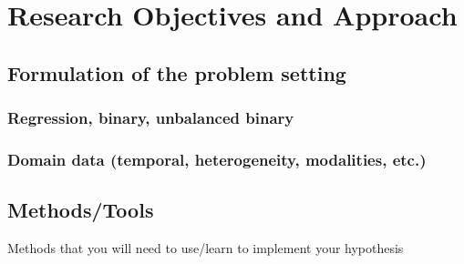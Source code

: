 \chapter{Research Objectives and Approach}
\label{cha:objectives}




\section{Formulation of the problem setting} %
\label{sec:problem}


\subsection{Regression, binary, unbalanced binary}

\subsection{Domain data (temporal, heterogeneity, modalities, etc.)}




\section{Methods/Tools } %
\label{sec:methods}

Methods that you will need to use/learn to implement your hypothesis
